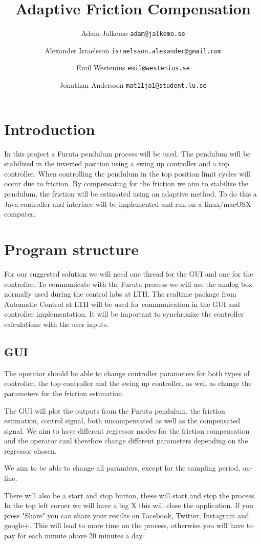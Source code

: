 \documentclass[10pt,a4paper]{article}
\author{Adam Jalkemo \texttt{adam@jalkemo.se} \and
Alexander Israelsson \texttt{israelsson.alexander@gmail.com} \and
Emil Westenius \texttt{emil@westenius.se} \and
Jonathan Andersson \texttt{mat11ja1@student.lu.se}}
\title{Adaptive Friction Compensation}
\begin{document}
\maketitle

\section{Introduction}
In this project a Furuta pendulum process will be used. The pendulum will be stabilized in the inverted position using a swing up controller and a top controller. When controlling the pendulum in the top position limit cycles will occur due to friction. By compensating for the friction we aim to stabilize the pendulum, the friction will be estimated using an adaptive method. To do this a Java controller and interface will be implemented and run on a linux/macOSX computer.
\section{Program structure}
For our suggested solution we will need one thread for the GUI and one for the controller. To communicate with the Furuta process we will use the analog box normally used during the control labs at LTH. The realtime package from Automatic Control at LTH will be used for communication in the GUI and controller implementation. It will be important to synchronize the controller calculations with the user inputs. 


\subsection{GUI}
The operator should be able to change controller parameters for both types of controller, the top controller and the swing up controller, as well as change the parameters for the friction estimation. 

The GUI will plot the outputs from the Furuta pendulum, the friction estimation, control signal, both uncompensated as well as the compensated signal. We aim to have different regressor modes for the friction compensation and the operator canl therefore change different parameters depending on the regressor chosen. 

We aim to be able to change all paramters, except for the sampling period, on-line.

There will also be a start and stop button, these will start and stop the process. In the top left corner we will have a big X this will close the application. If you press "Share" you can share your results on Facebook, Twitter, Instagram and google+. This will lead to more time on the process, otherwise you will have to pay for each minute above 20 minutes a day. 
\end{document}
